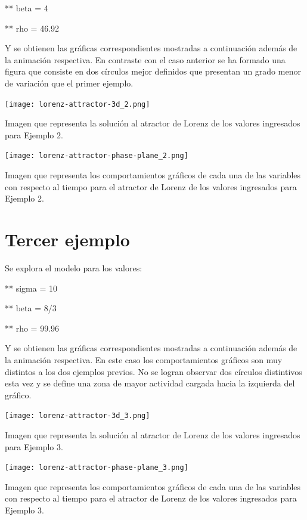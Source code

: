 \documentclass{article} %
\begin{document}
** beta = 4 

** rho = 46.92 

\vspace{0.5 cm}

Y se obtienen las gráficas correspondientes mostradas a continuación además de la animación respectiva. En contraste con el caso anterior se ha formado una figura que consiste en dos círculos mejor definidos que presentan un grado menor de variación que el primer ejemplo.

\begin{center}

	\texttt{[image: lorenz-attractor-3d\_2.png]}

Imagen que representa la solución al atractor de Lorenz de los valores ingresados para Ejemplo 2.

\end{center}


\begin{center}

	\texttt{[image: lorenz-attractor-phase-plane\_2.png]}
       
Imagen que representa los comportamientos gráficos de cada una de las variables con respecto al tiempo para el atractor de Lorenz de los valores ingresados para Ejemplo 2.

\end{center}


\section{Tercer ejemplo}

Se explora el modelo para los valores:

\vspace{0.5 cm}

** sigma = 10

** beta = 8/3

** rho = 99.96

\vspace{0.5 cm}

Y se obtienen las gráficas correspondientes mostradas a continuación además de la animación respectiva. En este caso los comportamientos gráficos son muy distintos a los dos ejemplos previos. No se logran observar dos círculos distintivos esta vez y se define una zona de mayor actividad cargada hacia la izquierda del gráfico.


\begin{center}

	\texttt{[image: lorenz-attractor-3d\_3.png]}
       
Imagen que representa la solución al atractor de Lorenz de los valores ingresados para Ejemplo 3.

\end{center}


\begin{center}

	\texttt{[image: lorenz-attractor-phase-plane\_3.png]}

Imagen que representa los comportamientos gráficos de cada una de las variables con respecto al tiempo para el atractor de Lorenz de los valores ingresados para Ejemplo 3.

\end{center}
\end{document}
